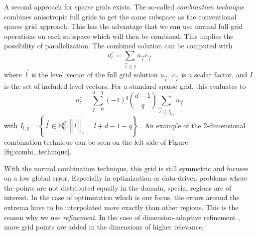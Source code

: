 A second approach for sparse grids exists. The so-called \textit{combination technique} \cite{griebel1990combination} combines anisotropic full grids to get the same subspace as the conventional sparse grid approach. This has the advantage that we can use normal full grid operations on each subspace which will then be combined. This implies the possibility of parallelization. The combined solution can be computed with 
\begin{equation}
	u_l^c = \sum_{ \vec{l} \in I } u_{\vec{l}} c_{\vec{l}}
\end{equation}
where $ \vec{l} $ is the level vector of the full grid solution $ u_{\vec{l}} $, $ c_{\vec{l}} $ is a scalar factor, and $ I $ is the set of included level vectors. For a standard sparse grid, this evaluates to 
\begin{equation}
	u_l^c = \sum_{ q = 0 }^{d-1} (-1)^q \binom{d-1}{q} \sum_{\vec{l} \in I_{l,q} } u_{\vec{l}}
\end{equation}
with $ I_{l,q} = \left\{ \vec{l} \in \mathbb{N}_0^d : \left|\left|\vec{l}\right|\right|_1 = l+d-1-q \right\} $ \cite{obersteiner2021generalized}. An example of the 2-dimensional combination technique can be seen on the left side of Figure \ref{fig:combi_technique}.

With the normal combination technique, this grid is still symmetric and focuses on a low global error. Especially in optimization or data-driven problems where the points are not distributed equally in the domain, special regions are of interest. In the case of optimization which is our focus, the errors around the extrema have to be interpolated more exactly than other regions. This is the reason why we use \textit{refinement}. In the case of dimension-adaptive refinement \cite{hegland2002adaptive}, more grid points are added in the dimensions of higher relevance. 


